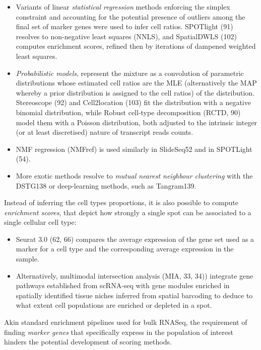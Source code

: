 \begin{itemize}
    \item Variants of linear \textit{statistical regression} methods enforcing the simplex constraint and accounting for the potential presence of outliers among the final set of marker genes were used to infer cell ratios. SPOTlight (91) resolves to non-negative least squares (NNLS), and SpatialDWLS (102) computes enrichment scores, refined then by iterations of dampened weighted least squares.
    \item \textit{Probabilistic models}, represent the mixture as a convolution of parametric distributions whose estimated cell ratios are the MLE (alternatively the MAP whereby a prior distribution is assigned to the cell ratios) of the distribution. Stereoscope (92) and Cell2location (103) fit the distribution with a negative binomial distribution, while Robust cell-type decomposition (RCTD, 90) model them with a Poisson distribution,  both adjusted to the intrinsic integer (or at least discretised) nature of transcript reads counts. 
    
    \item NMF regression (NMFref) is used similarly in SlideSeq52 and in SPOTLight (54).      
    \item More exotic methods resolve to \textit{mutual nearest neighbour clustering} with the DSTG138 or deep-learning methods, such as Tangram139.  
\end{itemize}

Instead of inferring the cell types proportions, it is also possible to compute \textit{enrichment scores}, that depict how strongly a single spot can be associated to a single cellular cell type: 
\begin{itemize}
    \item Seurat 3.0 (62, 66) compares the average expression of the gene set used as a marker for a cell type and the corresponding average expression in the sample. 
    \item Alternatively, multimodal intersection analysis (MIA, 33, 34)) integrate gene pathways established from scRNA-seq with gene modules enriched in spatially identified tissue niches inferred from spatial barcoding to deduce to what extent cell populations are enriched or depleted in a spot. 
\end{itemize}
Akin standard enrichment pipelines used for bulk RNASeq, the requirement of finding \textit{marker genes} that specifically express in the population of interest hinders the potential development of scoring methods.



